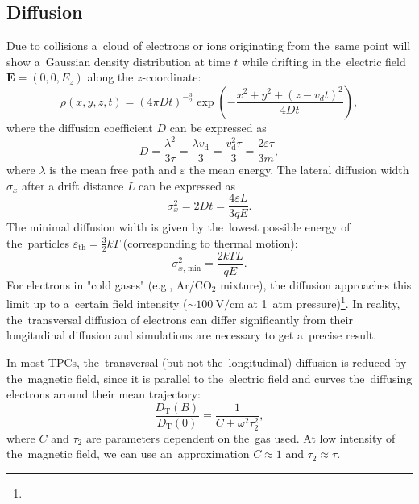		\subsection{Diffusion}
			Due to collisions a~cloud of electrons or ions originating from the~same point will show a~Gaussian density distribution at time $t$ while drifting in the~electric field $\mathbf{E} = (0,0,E_z)$ along the $z$\nobreakdash-coordinate:
				\begin{equation}
					\rho(x,y,z,t) = (4\pi Dt)^{-\frac{3}{2}} \exp\left(-\frac{x^2+y^2+(z-v_dt)^2}{4Dt}\right),
				\end{equation}
			where the diffusion coefficient $D$ can be expressed as
				\begin{equation}
					D = \frac{\lambda^2}{3\tau} = \frac{\lambda v_\text{d}}{3} = \frac{v_\text{d}^2\tau}{3} = \frac{2\varepsilon\tau}{3m},
				\end{equation}
			where $\lambda$ is the mean free path and $\varepsilon$ the mean energy. The lateral diffusion width $\sigma_x$ after a drift distance $L$ can be expressed as
				\begin{equation}
					\sigma_x^2 = 2Dt = \frac{4\varepsilon L}{3qE}.
				\end{equation}
			The minimal diffusion width is given by the~lowest possible energy of the~particles $\varepsilon_\text{th} = \frac{3}{2}kT$ (corresponding to thermal motion):
				\begin{equation}
					\sigma_{x, \,\text{min}}^2 = \frac{2kTL}{qE}.
				\end{equation}
			For electrons in "cold gases" (e.g., Ar/CO$_2$ mixture), the diffusion approaches this limit up to a~certain field intensity ($\sim 100~\text{V}/\text{cm}$ at 1~atm pressure)\footnote{}. In reality, the~transversal diffusion of electrons can differ significantly from their longitudinal diffusion and simulations are necessary to get a~precise result.
			
			In most \ac{TPC}s, the~transversal (but not the~longitudinal) diffusion is reduced by the~magnetic field, since it is parallel to the~electric field and curves the~diffusing electrons around their mean trajectory:
				\begin{equation}
					\label{eq:difmag}
					\frac{D_\text{T}(B)}{D_\text{T}(0)} = \frac{1}{C+\omega^2\tau_2^2},
				\end{equation}
			where $C$ and $\tau_2$ are parameters dependent on the~gas used. At low intensity of the~magnetic field, we can use an~approximation $C\approx1$ and $\tau_2\approx\tau$.
	
